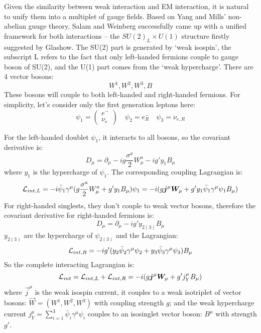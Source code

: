 Given the similarity between weak interaction and EM interaction, it is natural
to unify them into a multiplet of gauge fields. Based on Yang and Mills' non-abelian 
guuge theory, Salam and Weinberg successfully came up with a unified 
framework for both interactions -- the $SU(2)_L \times U(1)$ structure firstly suggested 
by Glashow. The SU(2) part is generated by `weak isospin', the subscript L refers
to the fact that only left-handed fermions couple to gauge boson of SU(2), and the U(1)
part comes from the `weak hypercharge'. There are 4 vector bosons:
$$ W^1, W^2, W^3, B $$
These bosons will couple to both left-handed and right-handed fermions. For simplicity,
let's consider only the first generation leptons here:
\begin{equation}
    \psi_1 = \begin{pmatrix} e^-    \\ \nu_e	\end{pmatrix}	\quad
    \psi_2 = e^-_R    \quad
    \psi_3 = \nu_{e,R}
\end{equation}

For the left-handed doublet $\psi_1$, it interacts to all bosons, 
so the covariant derivative is:
\begin{equation}
    D_\mu = \partial_\mu - ig\frac{\sigma^a}{2}W_\mu^a - ig'y_1B_\mu
\end{equation}
where $y_1$ is the hypercharge of $\psi_1$.
The corresponding coupling Lagrangian is:
\begin{equation}
    \mathcal{L}_{int, L} = -i\bar{\psi}_1 \gamma^\mu (g\frac{\sigma^a}{2}W^a_\mu + g'y_1B_\mu) \psi_1
	= -i(g\boldsymbol{j}^\mu\boldsymbol{W}_\mu + g'y_1\bar{\psi}_1\gamma^\mu\psi_1 B_\mu)
\end{equation}
For right-handed singlests, they don't couple to weak vector bosons, 
therefore the covariant derivative for right-handed fermions is:
\begin{equation}
    D_\mu = \partial_\mu - ig'y_{2(3)}B_\mu
\end{equation}
$y_{2(3)}$ are the hypercharge of $\psi_{2(3)}$
and the Lagrangian:
\begin{equation}
    \mathcal{L}_{int, R} = -ig'(y_2\bar{\psi}_2 \gamma^\mu \psi_2 + y_3\bar{\psi}_3\gamma^\mu \psi_3) B_\mu
\end{equation}
So the complete interacting Lagrangian is:
\begin{equation}
    \mathcal{L}_{int} = \mathcal{L}_{int, L} + \mathcal{L}_{int, R} = -i(g\boldsymbol{j}^\mu \boldsymbol{W}_\mu + g'j^\mu_{Y} B_\mu)
    \label{eqn:GSW}
\end{equation}
where $\vec{j}^\mu$ is the weak isospin current, it couples to a weak 
isotriplet of vector bosons: $\vec{W} = (W^1, W^2, W^3)$ with
coupling strength $g$; and the weak hypercharge current 
$j^\mu_{Y} = \sum_{i=1}^3 \bar{\psi}_i\gamma^\mu\psi_i$ couples to 
an isosinglet vector boson: $B^\mu$ with strength $g'$. 


